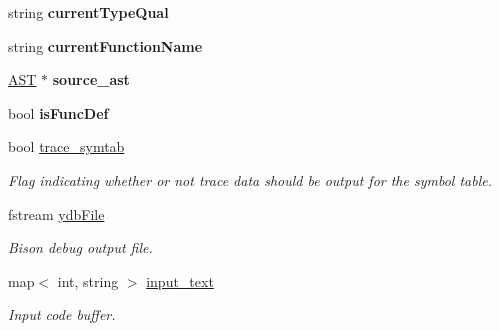 \begin{DoxyCompactItemize}
\item 
\hypertarget{classCCompiler_a61d87c2af58a14b39b5fb8735acaab19}{string {\bfseries current\-Type\-Qual}}\label{classCCompiler_a61d87c2af58a14b39b5fb8735acaab19}

\item 
\hypertarget{classCCompiler_aca8fde29fdf0b2b75dae37d18c7ac9ba}{string {\bfseries current\-Function\-Name}}\label{classCCompiler_aca8fde29fdf0b2b75dae37d18c7ac9ba}

\item 
\hypertarget{classCCompiler_a94e03364c71137c777ae68d0c39488ac}{\hyperlink{classAST}{A\-S\-T} $\ast$ {\bfseries source\-\_\-ast}}\label{classCCompiler_a94e03364c71137c777ae68d0c39488ac}

\item 
\hypertarget{classCCompiler_a9e8d71266472caab89f4c3078a07ea50}{bool {\bfseries is\-Func\-Def}}\label{classCCompiler_a9e8d71266472caab89f4c3078a07ea50}

\item 
\hypertarget{classCCompiler_a3c5de89c525d74fa8cbc0ff024cd1ec3}{bool \hyperlink{classCCompiler_a3c5de89c525d74fa8cbc0ff024cd1ec3}{trace\-\_\-symtab}}\label{classCCompiler_a3c5de89c525d74fa8cbc0ff024cd1ec3}

\begin{DoxyCompactList}\small\item\em Flag indicating whether or not trace data should be output for the symbol table. \end{DoxyCompactList}\item 
\hypertarget{classCCompiler_aa185f3a3e7345798eecf9e4cbfb6be1a}{fstream \hyperlink{classCCompiler_aa185f3a3e7345798eecf9e4cbfb6be1a}{ydb\-File}}\label{classCCompiler_aa185f3a3e7345798eecf9e4cbfb6be1a}

\begin{DoxyCompactList}\small\item\em Bison debug output file. \end{DoxyCompactList}\item 
\hypertarget{classCCompiler_a04d154771bac1905b7885a6a73b24206}{map$<$ int, string $>$ \hyperlink{classCCompiler_a04d154771bac1905b7885a6a73b24206}{input\-\_\-text}}\label{classCCompiler_a04d154771bac1905b7885a6a73b24206}

\begin{DoxyCompactList}\small\item\em Input code buffer. \end{DoxyCompactList}\end{DoxyCompactItemize}
